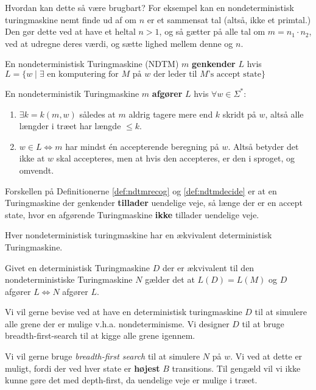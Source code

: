 Hvordan kan dette så være brugbart? For eksempel kan en nondeterministisk turingmaskine nemt finde ud af om $n$ er et sammensat tal (altså, ikke et primtal.) Den gør dette ved at have et heltal $n > 1$, og så gætter på alle tal om $m = n_{1} \cdot n_{2}$, ved at udregne deres værdi, og sætte lighed mellem denne og $n$.


\begin{definition}
  \label{def:ndtmrecog}
En nondeterministisk Turingmaskine (NDTM) $m$ \textbf{genkender} $L$ hvis $L = \{w \mid \exists \text{ en komputering for }M \text{ på } w \text{ der leder til } M \text{'s accept state} \}$
\end{definition}

\begin{definition}
  \label{def:ndtmdecide}
  En nondeterministik Turingmaskine $m$ \textbf{afgører} $L$ hvis $\forall w \in \Sigma^{*}$:
  \begin{enumerate}
	\item $\exists k = k(m,w)$ således at $m$ aldrig tagere mere end $k$ skridt på $w$, altså alle længder i træet har længde $\leq k$.
	\item $w \in L \iff m$  har mindst én accepterende beregning på $w$. Altså betyder det ikke at $w$ skal accepteres, men at hvis den accepteres, er den i sproget, og omvendt.
  \end{enumerate}
\end{definition}

Forskellen på Definitionerne \ref{def:ndtmrecog} og \ref{def:ndtmdecide} er at en Turingmaskine der genkender \textbf{tillader} uendelige veje, så længe der er en accept state, hvor en afgørende Turingmaskine \textbf{ikke} tillader uendelige veje.

\begin{theorem}
	\label{teo:nondeterminismturingequiv}
	Hver nondeterministisk turingmaskine har en ækvivalent deterministisk Turingmaskine.
\end{theorem}

Givet en deterministisk Turingmaskine $D$ der er ækvivalent til den nondeterministiske Turingmaskine $N$ gælder det at $L(D) = L(M)$ og $D$ afgører $L \iff N$ afgører $L$.

Vi vil gerne bevise ved at have en deterministisk turingmaskine $D$ til at simulere alle grene der er mulige v.h.a. nondeterminisme. Vi designer $D$ til at bruge breadth-first-search til at kigge alle grene igennem.

Vi vil gerne bruge \textit{breadth-first search} til at simulere $N$ på $w$. Vi ved at dette er muligt, fordi der ved hver state er \textbf{højest} $B$ transitions. Til gengæld vil vi ikke kunne gøre det med depth-first, da uendelige veje er mulige i træet.

